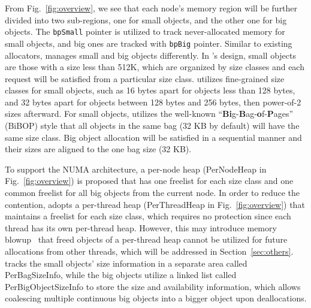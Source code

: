 
From Fig.~\ref{fig:overview}, we see that each node's memory region will be further divided into two sub-regions, one for small objects, and the other one for big objects. The \texttt{bpSmall} pointer is utilized to track never-allocated memory for small objects, and big ones are tracked with \texttt{bpBig} pointer. Similar to existing allocators, \NM{} manages small and big objects differently. In \NM{}'s design, small objects are those with a size less than 512K, which are organized by size classes and each request will be satisfied from a particular size class. \NA{} utilizes fine-grained size classes for small objects, such as 16 bytes apart for objects less than 128 bytes, and 32 bytes apart for objects between 128 bytes and 256 bytes, then power-of-2 sizes afterward. For small objects, \NM{} utilizes the well-known ``\textbf{Bi}g-\textbf{B}ag-\textbf{o}f-\textbf{P}ages'' (BiBOP) style that all objects in the same bag (32 KB by default) will have the same size class. Big object allocation will be satisfied in a sequential manner and their sizes are aligned to the one bag size (32 KB).

To support the NUMA architecture, a per-node heap (PerNodeHeap in Fig.~\ref{fig:overview}) is proposed that has one freelist for each size class and one common freelist for all big objects from the current node. 
In order to reduce the contention, \NM{} adopts a per-thread heap (PerThreadHeap in Fig.~\ref{fig:overview}) that maintains a freelist for each size class, which requires no protection since each thread has its own per-thread heap. However, this may introduce memory blowup~\cite{Hoard} that freed objects of a per-thread heap cannot be utilized for future allocations from other threads, which will be addressed in Section~\ref{sec:others}. 
\NM{} tracks the small objects' size information in a separate area called PerBagSizeInfo, while the big objects utilize a linked list called PerBigObjectSizeInfo to store the size and availability information, which allows coalescing multiple continuous big objects into a bigger object upon deallocations.

